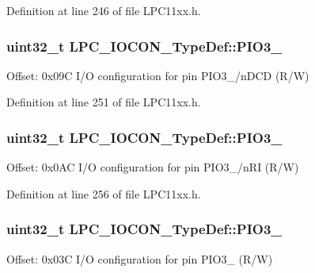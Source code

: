Definition at line 246 of file L\+P\+C11xx.\+h.

\subsubsection[{\texorpdfstring{P\+I\+O3\+\_\+2}{PIO3_2}}]{ uint32\+\_\+t L\+P\+C\+\_\+\+I\+O\+C\+O\+N\+\_\+\+Type\+Def\+::\+P\+I\+O3\+\_}\hypertarget{group___l_p_c11xx___definitions_ga55e0f9c076d146081bae89118a344894}{}\label{group___l_p_c11xx___definitions_ga55e0f9c076d146081bae89118a344894}
Offset\+: 0x09C I/O configuration for pin P\+I\+O3\+\_/n\+D\+CD (R/W) 

Definition at line 251 of file L\+P\+C11xx.\+h.

\subsubsection[{\texorpdfstring{P\+I\+O3\+\_\+3}{PIO3_3}}]{ uint32\+\_\+t L\+P\+C\+\_\+\+I\+O\+C\+O\+N\+\_\+\+Type\+Def\+::\+P\+I\+O3\+\_}\hypertarget{group___l_p_c11xx___definitions_ga8297919bcdca8419b6f8347e76a042ef}{}\label{group___l_p_c11xx___definitions_ga8297919bcdca8419b6f8347e76a042ef}
Offset\+: 0x0\+AC I/O configuration for pin P\+I\+O3\+\_/n\+RI (R/W) 

Definition at line 256 of file L\+P\+C11xx.\+h.

\subsubsection[{\texorpdfstring{P\+I\+O3\+\_\+4}{PIO3_4}}]{ uint32\+\_\+t L\+P\+C\+\_\+\+I\+O\+C\+O\+N\+\_\+\+Type\+Def\+::\+P\+I\+O3\+\_}\hypertarget{group___l_p_c11xx___definitions_gac3ab46069cfc989752861c981fcd8b0a}{}\label{group___l_p_c11xx___definitions_gac3ab46069cfc989752861c981fcd8b0a}
Offset\+: 0x03C I/O configuration for pin P\+I\+O3\+\_ (R/W) 

